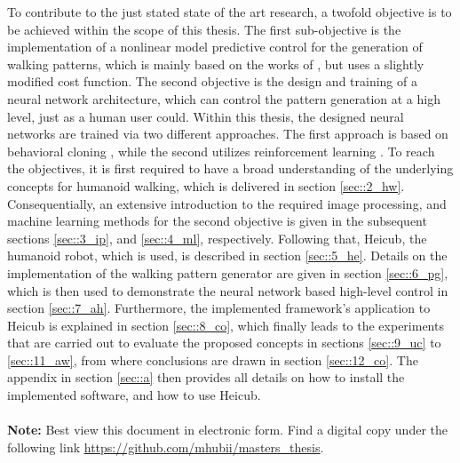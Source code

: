 To contribute to the just stated state of the art research, a twofold objective is to be achieved within the scope of this thesis. The first sub-objective is the implementation of a nonlinear model predictive control for the generation of walking patterns, which is mainly based on the works of \cite{naveau2016reactive}, but uses a slightly modified cost function. The second objective is the design and training of a neural network architecture, which can control the pattern generation at a high level, just as a human user could. Within this thesis, the designed neural networks are trained via two different approaches. The first approach is based on behavioral cloning \cite{bojarski2016end}, while the second utilizes reinforcement learning \cite{schulman2017proximal}. To reach the objectives, it is first required to have a broad understanding of the underlying concepts for humanoid walking, which is delivered in section \ref{sec::2_hw}. Consequentially, an extensive introduction to the required image processing, and machine learning methods for the second objective is given in the subsequent sections \ref{sec::3_ip}, and \ref{sec::4_ml}, respectively. Following that, Heicub, the humanoid robot, which is used, is described in section \ref{sec::5_he}. Details on the implementation of the walking pattern generator are given in section \ref{sec::6_pg}, which is then used to demonstrate the neural network based high-level control in section \ref{sec::7_ah}. Furthermore, the implemented framework's application to Heicub is explained in section \ref{sec::8_co}, which finally leads to the experiments that are carried out to evaluate the proposed concepts in sections \ref{sec::9_uc} to \ref{sec::11_aw}, from where conclusions are drawn in section \ref{sec::12_co}. The appendix in section \ref{sec::a} then provides all details on how to install the implemented software, and how to use Heicub.
\\\\
\textbf{Note:} Best view this document in electronic form. Find a digital copy under the following link \href{https://github.com/mhubii/masters_thesis}{\underline{https://github.com/mhubii/masters\_thesis}}.
